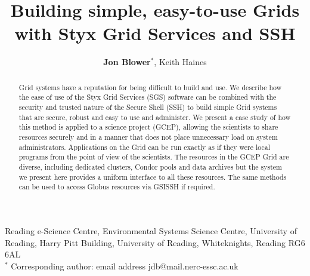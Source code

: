 \documentclass[a4paper]{article}
\begin{document}
\title{Building simple, easy-to-use Grids with Styx Grid Services and SSH}

\author{\textbf{Jon Blower$^{*}$}, Keith Haines}
\date{}

\maketitle

\begin{center}
Reading e-Science Centre, Environmental Systems Science Centre, University of Reading, Harry Pitt Building, University of Reading, Whiteknights, Reading RG6 6AL \\
\medskip
$^{*}$ Corresponding author: email address jdb@mail.nerc-essc.ac.uk
\end{center}

\bigskip

\begin{abstract}
Grid systems have a reputation for being difficult to build and use.  We describe how the ease of use of the Styx Grid Services (SGS) software can be combined with the security and trusted nature of the Secure Shell (SSH) to build simple Grid systems that are secure, robust and easy to use and administer.  We present a case study of how this method is applied to a science project (GCEP), allowing the scientists to share resources securely and in a manner that does not place unnecessary load on system administrators.  Applications on the Grid can be run exactly as if they were local programs from the point of view of the scientists.  The resources in the GCEP Grid are diverse, including dedicated clusters, Condor pools and data archives but the system we present here provides a uniform interface to all these resources.  The same methods can be used to access Globus resources via GSISSH if required.
\end{abstract}

\bigskip
\end{document}
